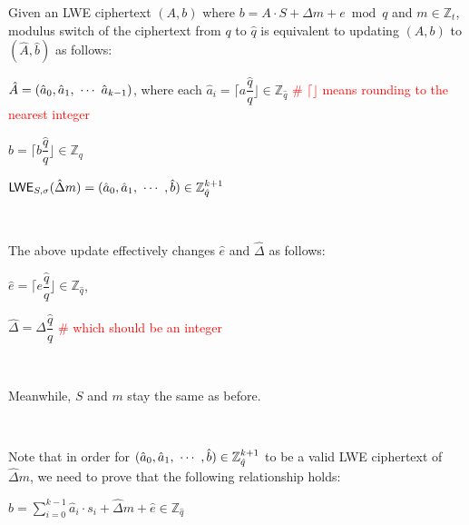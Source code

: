 \begin{tcolorbox}[title={\textbf{\tboxlabel{\ref*{subsec:modulus-switch-lwe}} LWE Modulus Switching}}]

Given an LWE ciphertext $(A, b)$ where $b = A\cdot S + \Delta m + e \bmod q$ and $m \in \mathbb{Z}_t$, modulus switch of the ciphertext from $q$ to $\hat q$ is equivalent to updating $(A, b)$ to $(\hat A, \hat b)$ as follows:


$\hat{A} = (\hat{a}_0, \hat{a}_1, \text{ } \text{$\cdots$} \text{ } \hat{a}_{k-1})$, where each $\hat{a}_i = \Big\lceil a\dfrac{\hat{q}}{q} \Big\rfloor \in \mathbb{Z}_{\hat{q}}$ \textcolor{red}{\# $\lceil \rfloor$ means rounding to the nearest integer}

 $\hat{b} = \Big\lceil b \dfrac{\hat{q}}{q} \Big\rfloor \in \mathbb{Z}_{\hat{q}}$

$\textsf{LWE}_{{S},\sigma}(\hat{\Delta}  m) = (\hat{a}_0, \hat{a}_1, \text{ } \text{$\cdots$} \text{ }, \hat{b}) \in \mathbb{Z}_{\hat{q}}^{k + 1}$ 

$ $


The above update effectively changes $\hat e$ and $\hat \Delta$ as follows:

$\hat{e} = \Big\lceil e\dfrac{\hat{q}}{q} \Big\rfloor \in \mathbb{Z}_{\hat{q}}$, \text{ }

$\hat{\Delta} = \Delta\dfrac{\hat{q}}{q}$ \textcolor{red}{\# which should be an integer}

$ $


Meanwhile, $S$ and $m$ stay the same as before.

\end{tcolorbox}

$ $

 Note that in order for $(\hat{a}_0, \hat{a}_1, \text{ } \text{$\cdots$} \text{ }, \hat{b}) \in \mathbb{Z}_{\hat{q}}^{k + 1}$ to be a valid LWE ciphertext of $\hat{\Delta}m$, we need to prove that the following relationship holds:

$\hat{b} = \sum\limits_{i=0}^{k-1}\hat{a}_i \cdot s_i + \hat{\Delta} m + \hat{e} \in \mathbb{Z}_{\hat{q}}$

$ $

